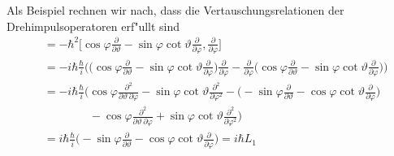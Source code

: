 Als Beispiel rechnen wir nach, dass die Vertauschungsrelationen der
Drehimpulsoperatoren erf"ullt sind
\begin{align*}
[L_2,L_3]
&=-\hbar^2\biggl[
\cos\varphi\frac{\partial}{\partial\vartheta}
-\sin\varphi\cot\vartheta\frac{\partial}{\partial\varphi}
,\frac{\partial}{\partial\varphi}
\biggr]
\\
&=
-i\hbar\frac{\hbar}{i}\biggl(
\biggl(
\cos\varphi\frac{\partial}{\partial\vartheta}
-\sin\varphi\cot\vartheta\frac{\partial}{\partial\varphi}
\biggr)
\frac{\partial}{\partial\varphi}
-
\frac{\partial}{\partial\varphi}
\biggl(
\cos\varphi\frac{\partial}{\partial\vartheta}
-\sin\varphi\cot\vartheta\frac{\partial}{\partial\varphi}
\biggr)
\biggr)
\\
&=
-i\hbar\frac{\hbar}{i}\biggl(
\cos\varphi\frac{\partial^2}{\partial\vartheta\,\partial\varphi}
-\sin\varphi\cot\vartheta\frac{\partial^2}{\partial\varphi^2}
-
\biggl(
-\sin\varphi\frac{\partial}{\partial\vartheta}
-\cos\varphi\cot\vartheta\frac{\partial}{\partial\varphi}
\biggr)
\\
&\qquad\qquad
-
\cos\varphi\frac{\partial^2}{\partial\vartheta\,\partial\varphi}
+\sin\varphi\cot\vartheta\frac{\partial^2}{\partial\varphi^2}
\biggr)
\\
&=
i\hbar\frac{\hbar}{i}\biggl(
-
\sin\varphi\frac{\partial}{\partial\vartheta}
-
\cos\varphi\cot\vartheta\frac{\partial}{\partial\varphi}
\biggr)
=i\hbar L_1
\end{align*}

